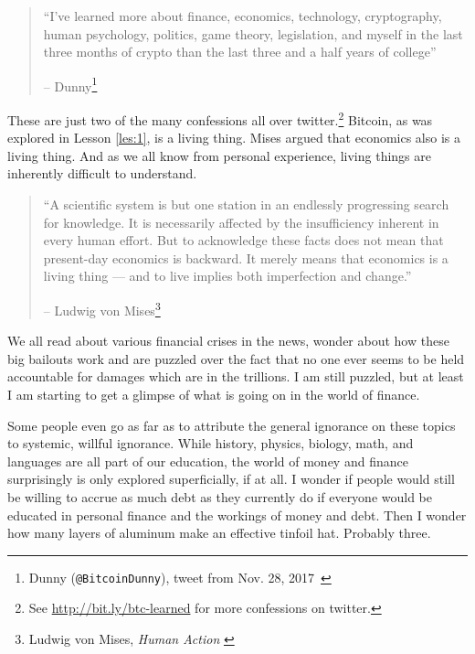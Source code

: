 \begin{quotation}\begin{samepage}
\enquote{I've learned more about finance, economics, technology, cryptography, human
psychology, politics, game theory, legislation, and myself in the last three
months of crypto than the last three and a half years of college}
\begin{flushright} -- Dunny\footnote{Dunny (\texttt{@BitcoinDunny}), tweet from Nov. 28,
2017~\cite{bitcoindunny-tweet}}
\end{flushright}\end{samepage}\end{quotation}

These are just two of the many confessions all over twitter.\footnote{See
\url{http://bit.ly/btc-learned} for more confessions on twitter.} Bitcoin, as
was explored in Lesson \ref{les:1}, is a living thing. Mises argued that
economics also is a living thing. And as we all know from personal experience,
living things are inherently difficult to understand.

\begin{quotation}\begin{samepage}
\enquote{A scientific system is but one station in an endlessly progressing
search for knowledge. It is necessarily affected by the insufficiency
inherent in every human effort. But to acknowledge these facts does
not mean that present-day economics is backward. It merely means that
economics is a living thing --- and to live implies both imperfection
and change.}
\begin{flushright} -- Ludwig von Mises\footnote{Ludwig von Mises, \textit{Human Action}
\cite{human-action}}
\end{flushright}\end{samepage}\end{quotation}

\newpage

We all read about various financial crises in the news, wonder about how
these big bailouts work and are puzzled over the fact that no one ever
seems to be held accountable for damages which are in the trillions. I
am still puzzled, but at least I am starting to get a glimpse of what is
going on in the world of finance.

Some people even go as far as to attribute the general ignorance on
these topics to systemic, willful ignorance. While history, physics,
biology, math, and languages are all part of our education, the world of
money and finance surprisingly is only explored superficially, if at
all. I wonder if people would still be willing to accrue as much debt as
they currently do if everyone would be educated in personal finance and
the workings of money and debt. Then I wonder how many layers of
aluminum make an effective tinfoil hat. Probably three.

